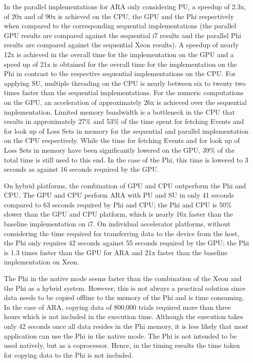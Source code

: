 In the parallel implementations for ARA only considering PU, a speedup of 2.3x, of 20x and of 90x is achieved on the CPU, the GPU and the Phi respectively when compared to the corresponding sequential implementations (the parallel GPU results are compared against the sequential i7 results and the parallel Phi results are compared against the sequential Xeon results). 
A speedup of nearly 12x is achieved in the overall time for the implementation on the GPU and a speed up of 21x is obtained for the overall time for the implementation on the Phi in contrast to the respective sequential implementations on the CPU. 
For applying SU, multiple threading on the CPU is nearly between six to twenty two times faster than the sequential implementations. 
For the numeric computations on the GPU, an acceleration of approximately 26x is achieved over the sequential implementation.
Limited memory bandwidth is a bottleneck in the CPU that results in approximately 27\% and 53\% of the time spent for fetching Events and for look up of Loss Sets in memory for the sequential and parallel implementation on the CPU respectively. 
While the time for fetching Events and for look up of Loss Sets in memory have been significantly lowered on the GPU, 39\% of the total time is still used to this end. 
In the case of the Phi, this time is lowered to 3 seconds as against 16 seconds required by the GPU. 

On hybrid platforms, the combination of GPU and CPU outperform the Phi and CPU. 
The GPU and CPU perform ARA with PU and SU in only 41 seconds compared to 63 seconds required by Phi and CPU; the Phi and CPU is 50\% slower than the GPU and CPU platform, which is nearly 16x faster than the baseline implementation on i7. 
On individual accelerator platforms, without considering the time required for transferring data to the device from the host, the Phi only requires 42 seconds against 55 seconds required by the GPU; the Phi is 1.3 times faster than the GPU for ARA and 21x faster than the baseline implementation on Xeon. 

The Phi in the native mode seems faster than the combination of the Xeon and the Phi as a hybrid system. However, this is not always a practical solution since data needs to be copied offline to the memory of the Phi and is time consuming. In the case of ARA, copying data of 800,000 trials required more than three hours which is not included in the execution time. Although the execution takes only 42 seconds once all data resides in the Phi memory, it is less likely that most application can use the Phi in the native mode. The Phi is not intended to be used natively, but as a coprocessor. Hence, in the timing results the time taken for copying data to the Phi is not included.

